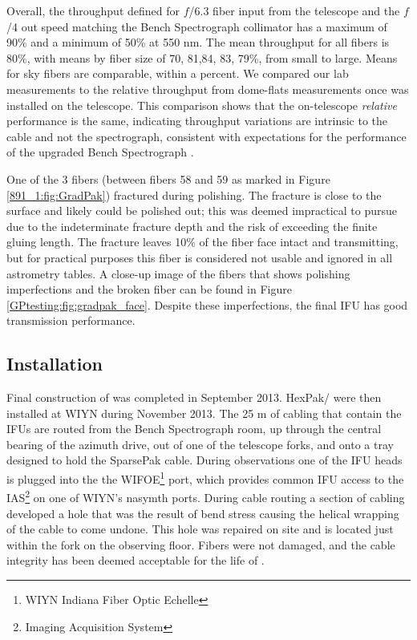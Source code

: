 Overall, the throughput defined for $f$/6.3 fiber input from the
telescope and the $f$/4 out speed matching the Bench Spectrograph
collimator has a maximum of 90\% and a minimum of 50\% at 550 nm. The
mean throughput for all fibers is 80\%, with means by fiber size of
70, 81,84, 83, 79\%, from small to large. Means for sky fibers are
comparable, within a percent. We compared our lab measurements to the
relative throughput from dome-flats measurements once \GP was
installed on the telescope. This comparison shows that the
on-telescope {\it relative} performance is the same, indicating
throughput variations are intrinsic to the cable and not the
spectrograph, consistent with expectations for the performance of the
upgraded Bench Spectrograph \citep{Bershady08,Knezek10}.

One of the 3 fibers (between fibers 58 and 59 as marked in Figure
\ref{891_1:fig:GradPak}) fractured during polishing. The fracture is
close to the surface and likely could be polished out; this was deemed
impractical to pursue due to the indeterminate fracture depth and the
risk of exceeding the finite gluing length. The fracture leaves 10\%
of the fiber face intact and transmitting, but for practical purposes
this fiber is considered not usable and ignored in all astrometry
tables.  A close-up image of the \GP fibers that shows polishing
imperfections and the broken fiber can be found in Figure
\ref{GPtesting:fig:gradpak_face}.  Despite these imperfections, the
final IFU has good transmission performance.

\subsection{Installation}
\label{891_1:sec:install}

Final construction of \GP was completed in September 2013.  HexPak/\GP
were then installed at WIYN during November 2013. The 25 m of cabling
that contain the IFUs are routed from the Bench Spectrograph room, up
through the central bearing of the azimuth drive, out of one of the
telescope forks, and onto a tray designed to hold the SparsePak
cable. During observations one of the IFU heads is plugged into the
the WIFOE\footnote{WIYN Indiana Fiber Optic Echelle} port, which
provides common IFU access to the IAS\footnote{Imaging Acquisition
  System} on one of WIYN's nasymth ports. During cable routing a
section of cabling developed a hole that was the result of bend stress
causing the helical wrapping of the cable to come undone. This hole
was repaired on site and is located just within the fork on the
observing floor. Fibers were not damaged, and the cable integrity has
been deemed acceptable for the life of \GP.

